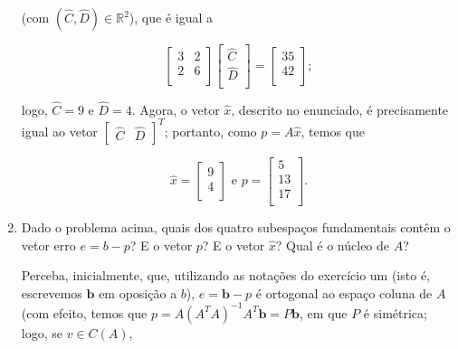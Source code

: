 \documentclass[leqno]{article}
\begin{document}
\begin{enumerate}
\begin{sol}
	\noindent (com $(\hat C, \hat D) \in \mathbb{R}^{2}$), que é igual a 

	\begin{equation*} 
		\begin{bmatrix} 
			3 & 2 \\ 
			2 & 6 \\ 
		\end{bmatrix}   
		\begin{bmatrix} 
			\hat C \\ 
			\hat D \\ 
		\end{bmatrix} 
		= 
		\begin{bmatrix} 
			35 \\ 
			42 \\ 
		\end{bmatrix}; 
	\end{equation*} 

	\noindent logo, $\hat C = 9$ e $\hat D = 4$. Agora, o vetor $\hat x$, descrito no enunciado, é precisamente igual ao vetor $\begin{bmatrix} \hat C & \hat D \end{bmatrix}^{T}$; portanto, como $p = A \hat x$, temos que 

	\begin{equation*} 
		\hat x = 
		\begin{bmatrix} 
			9 \\ 
			4 \\ 
		\end{bmatrix}    
		\text{ e } 
		p = 
		\begin{bmatrix} 
			5 \\ 
			13 \\ 
			17 \\ 
		\end{bmatrix}.   
	\end{equation*} 

\end{sol}


\item Dado o problema acima, quais dos quatro subespaços fundamentais contêm o vetor erro $e = b - p$? E o vetor $p$? E o vetor $\hat{x}$? Qual é o núcleo de $A$?

\begin{sol}
	Perceba, inicialmente, que, utilizando as notações do exercício um (isto é, escrevemos $\mathbf{b}$ em oposição a $b$),  $e = \mathbf{b} - p$ é ortogonal ao espaço coluna de $A$ (com efeito, temos que $p = A(A^{T}A)^{-1}A^{T}\mathbf{b} = P\mathbf{b}$, em que $P$ é simétrica; logo, se $v \in C(A)$, 


\end{sol}
\end{enumerate}
\end{document}

